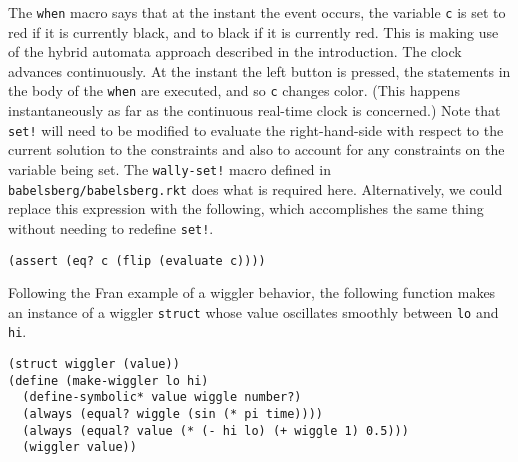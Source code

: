 \documentclass{article}
\begin{document}
The \verb|when| macro says that at the instant the event occurs, the
variable \verb|c| is set to red if it is currently black, and to black if
it is currently red.  This is making use of the hybrid automata approach
described in the introduction.  The clock advances continuously.  At the
instant the left button is pressed, the statements in the body of the
\verb|when| are executed, and so \verb|c| changes color.  (This happens
instantaneously as far as the continuous real-time clock is concerned.)
Note that \verb|set!| will need to be modified to evaluate the
right-hand-side with respect to the current solution to the constraints and
also to account for any constraints on the variable being set.  The
\verb|wally-set!| macro defined in \verb|babelsberg/babelsberg.rkt| does
what is required here.  Alternatively, we could replace this expression
with the following, which accomplishes the same thing without needing to
redefine \verb|set!|.
\begin{verbatim}
(assert (eq? c (flip (evaluate c))))
\end{verbatim}


Following the Fran example of a wiggler behavior, the following function
makes an instance of a wiggler \verb|struct| whose value oscillates
smoothly between \verb|lo| and \verb|hi|.
\begin{verbatim}
(struct wiggler (value))
(define (make-wiggler lo hi)
  (define-symbolic* value wiggle number?)
  (always (equal? wiggle (sin (* pi time))))
  (always (equal? value (* (- hi lo) (+ wiggle 1) 0.5)))
  (wiggler value))
\end{verbatim}

\end{document}
